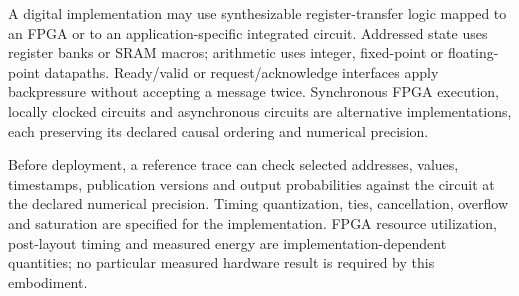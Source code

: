 \documentclass[pct]{sm-patent}
\begin{document}
\pnum A digital implementation may use synthesizable register-transfer logic mapped to an FPGA or to an application-specific integrated circuit. Addressed state uses register banks or SRAM macros; arithmetic uses integer, fixed-point or floating-point datapaths. Ready/valid or request/acknowledge interfaces apply backpressure without accepting a message twice. Synchronous FPGA execution, locally clocked circuits and asynchronous circuits are alternative implementations, each preserving its declared causal ordering and numerical precision.

\pnum Before deployment, a reference trace can check selected addresses, values, timestamps, publication versions and output probabilities against the circuit at the declared numerical precision. Timing quantization, ties, cancellation, overflow and saturation are specified for the implementation. FPGA resource utilization, post-layout timing and measured energy are implementation-dependent quantities; no particular measured hardware result is required by this embodiment.

\claimsstart
\end{document}
